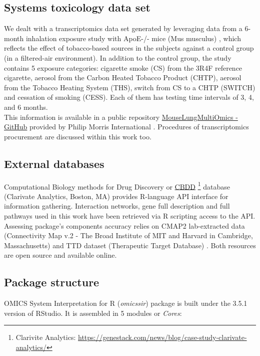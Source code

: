 \subsection{Systems toxicology data set}
We dealt with a transcriptomics data set generated by leveraging data from a 6-month inhalation exposure study with ApoE-/- mice (Mus musculus) \cite{LoSasso2016TheReduction} \cite{Phillips2016AnCigarettes}, which reflects the effect of tobacco-based sources in the subjects against a control group (in a filtered-air environment). In addition to the control group, the study contains 5 exposure categories: cigarette smoke (CS) from the 3R4F reference cigarette, aerosol from the Carbon Heated Tobacco Product (CHTP), aerosol from the Tobacco Heating System (THS), switch from CS to a CHTP (SWITCH) and cessation of smoking (CESS). Each of them has testing time intervals of 3, 4, and 6 months.
\\

This information is available in a public repository \href{https://github.com/philipmorrisintl/MouseLungMultiOmics}{MouseLungMultiOmics - GitHub} provided by Philip Morris International \cite{Titz2020Multi-omicsSmoke}. Procedures of transcriptomics procurement are discussed within this work too.
\\

\subsection{External databases}
\label{section:external-db}
Computational Biology methods for Drug Discovery or \href{https://genestack.com/news/blog/case-study-clarivate-analytics/}{CBDD} \footnote{Clarivite Analytics: \url{https://genestack.com/news/blog/case-study-clarivate-analytics/}} database (Clarivate Analytics, Boston, MA) provides R-language API interface for information gathering. Interaction networks, gene full description and full pathways used in this work have been retrieved via R scripting access to the API.
\\

Assessing package’s components accuracy relies on CMAP2 lab-extracted data (Connectivity Map v.2 - The Broad Institute of MIT and Harvard in Cambridge, Massachusetts) \cite{Subramanian2017AProfiles} and TTD dataset (Therapeutic Target Database) \cite{Wang2020TherapeuticTherapeutics}.
Both resources are open source and available online.
\\

\subsection{Package structure}
OMICS System Interpretation for R (\textit{omicssir}) package is built under the 3.5.1 version of RStudio. It is assembled in 5 modules or \textit{Cores}:
\\

